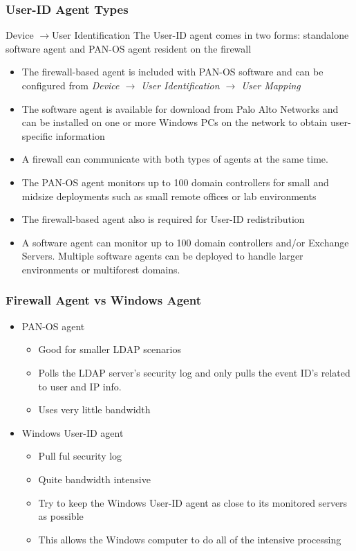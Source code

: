 \subsubsection{User-ID Agent Types}
Device $\rightarrow$User Identification
The User-ID agent comes in two forms: standalone software agent and PAN-OS agent resident on the firewall
\begin{itemize}
    \item The firewall-based agent is included with PAN-OS software and can be configured from \textit{Device $\rightarrow$ User Identification $\rightarrow$ User Mapping}
    \item The software agent is available for download from Palo Alto Networks and can be installed on one or more Windows PCs on the network to obtain user-specific information
    \item A firewall can communicate with both types of agents at the same time.
    \item The PAN-OS agent monitors up to 100 domain controllers for small and midsize deployments such as small remote offices or lab environments
    \item The firewall-based agent also is required for User-ID redistribution
    \item A software agent can monitor up to 100 domain controllers and/or Exchange Servers. Multiple software agents can be deployed to handle larger environments or multiforest domains.
\end{itemize}

\subsubsection{Firewall Agent vs Windows Agent}
\begin{itemize}
    \item PAN-OS agent
        \begin{itemize}
            \item Good for smaller LDAP scenarios
            \item Polls the LDAP server's security log and only pulls the event ID's related to user and IP info.
            \item Uses very little bandwidth
        \end{itemize}
    \item Windows User-ID agent
        \begin{itemize}
            \item Pull ful security log
            \item Quite bandwidth intensive
            \item Try to keep the Windows User-ID agent as close to its monitored servers as possible
            \item This allows the Windows computer to do all of the intensive processing
        \end{itemize}
\end{itemize}

